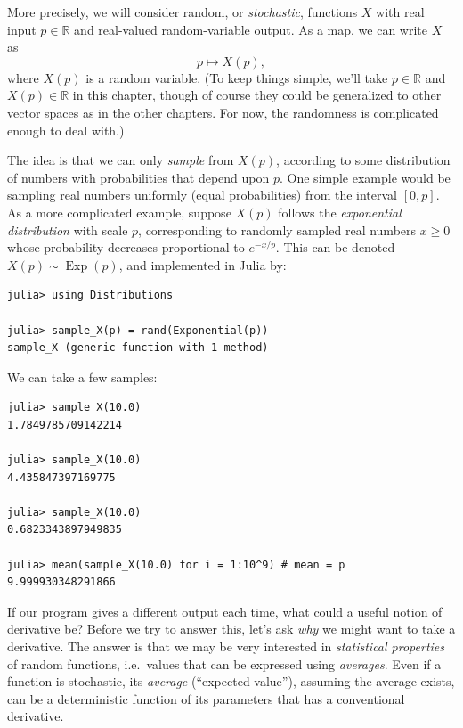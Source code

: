 More precisely, we will consider random, or \emph{stochastic}, functions $X$ with real input
$p \in \mathbb{R}$ and real-valued random-variable output. As a map, we can write $X$ as
\begin{equation}
    p \mapsto X(p),
\end{equation}
where $X(p)$ is a random variable.  (To keep things simple, we'll take $p \in \mathbb{R}$ and $X(p) \in \mathbb{R}$ in this chapter, though of course they could be generalized to other vector spaces as in the other chapters. For now, the randomness is complicated enough to deal with.)

The idea is that we can only \emph{sample} from $X(p)$, according to some distribution of numbers with probabilities that depend upon $p$.   One simple example would be sampling real numbers uniformly (equal probabilities) from the interval $[0,p]$. As a more complicated example, suppose $X(p)$ follows the \emph{exponential distribution} with scale $p$, corresponding to randomly sampled real numbers $x \ge 0$ whose probability decreases proportional to $e^{-x/p}$.  This can be denoted $X(p) \sim \operatorname{Exp}(p)$, and implemented in Julia by:

\begin{verbatim}
julia> using Distributions

julia> sample_X(p) = rand(Exponential(p))
sample_X (generic function with 1 method)
\end{verbatim}
We can take a few samples:
\begin{verbatim}
julia> sample_X(10.0)
1.7849785709142214

julia> sample_X(10.0)
4.435847397169775

julia> sample_X(10.0)
0.6823343897949835

julia> mean(sample_X(10.0) for i = 1:10^9) # mean = p
9.999930348291866
\end{verbatim}

If our program gives a different output each time, what could a useful notion of derivative be?
Before we try to answer this, let's ask \emph{why} we might want to take a derivative.
The answer is that we may be very interested in \emph{statistical properties} of random functions,
i.e.~values that can be expressed using \emph{averages}.  Even if a function is stochastic, its \emph{average} (``expected value''), assuming the average exists, can be a deterministic function of its parameters that has a conventional derivative.

